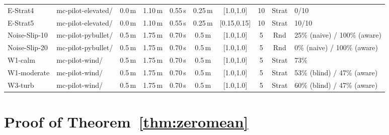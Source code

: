 \begin{table}[ht]
\begin{tabular}{llcccccccl}
    E-Strat4        & mc-pilot-elevated/  & 0.0\,m & 1.10\,m & 0.55\,s & 0.25\,m & [1.0,1.0] & 10 & Strat & 0/10 \\
    E-Strat5        & mc-pilot-elevated/  & 0.0\,m & 1.10\,m & 0.55\,s & 0.25\,m & [0.15,0.15] & 10 & Strat & 10/10 \\
    \midrule
    Noise-Slip-10   & mc-pilot-pybullet/  & 0.5\,m & 1.75\,m & 0.70\,s & 0.5\,m & [1.0,1.0] & 5  & Rnd & 25\% (naive) / 100\% (aware) \\
    Noise-Slip-20   & mc-pilot-pybullet/  & 0.5\,m & 1.75\,m & 0.70\,s & 0.5\,m & [1.0,1.0] & 5  & Rnd & 0\% (naive) / 100\% (aware) \\
    \midrule
    W1-calm         & mc-pilot-wind/      & 0.5\,m & 1.75\,m & 0.70\,s & 0.5\,m & [1.0,1.0] & 5  & Strat & 73\% \\
    W1-moderate     & mc-pilot-wind/      & 0.5\,m & 1.75\,m & 0.70\,s & 0.5\,m & [1.0,1.0] & 5  & Strat & 53\% (blind) / 47\% (aware) \\
    W3-turb         & mc-pilot-wind/      & 0.5\,m & 1.75\,m & 0.70\,s & 0.5\,m & [1.0,1.0] & 5  & Strat & 60\% (blind) / 47\% (aware) \\
    \bottomrule
  \end{tabular}
\end{table}

\section{Proof of Theorem~\ref{thm:zeromean}}
\label{app:zeromean}

